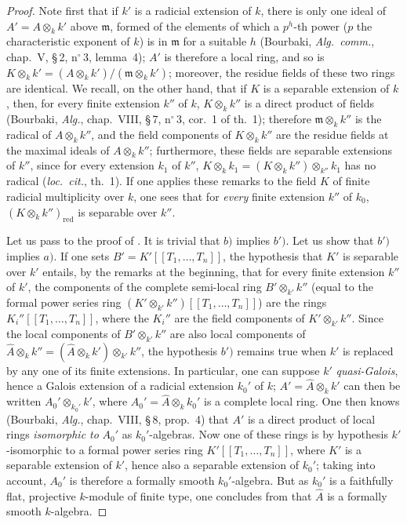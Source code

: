 \begin{proof}
Note first that if $k'$ is a radicial extension of $k$, there is only one ideal of $A'=A\otimes_k k'$ above $\mathfrak{m}$, formed of the elements of which a $p^h$-th power ($p$ the characteristic exponent of $k$) is in $\mathfrak{m}$ for a suitable $h$ (Bourbaki, \emph{Alg.\ comm.}, chap.~V, \S\,2, n$^\circ$\,3, lemma~4);
$A'$ is therefore a local ring, and so is
$K\otimes_k k'=(A\otimes_k k')/(\mathfrak{m}\otimes_k k')$; moreover, the residue fields of these two rings are identical.
We recall, on the other hand, that if $K$ is a separable extension of $k$, then, for every finite extension $k''$ of $k$, $K\otimes_k k''$ is a direct product of fields (Bourbaki, \emph{Alg.}, chap.~VIII, \S\,7, n$^\circ$\,3, cor.~1 of th.~1);
therefore $\mathfrak{m}\otimes_k k''$ is the radical of $A\otimes_k k''$, and the field components of $K\otimes_k k''$ are the residue fields at the maximal ideals of $A\otimes_k k''$;
furthermore, these fields are separable extensions of $k''$, since for every extension $k_1$ of $k''$,
$K\otimes_k k_1=(K\otimes_k k'')\otimes_{k''}k_1$ has no radical (\emph{loc.\ cit.}, th.~1).
If one applies these remarks to the field $K$ of finite radicial multiplicity over $k$, one sees that for \emph{every} finite extension $k''$ of $k_0$, $(K\otimes_k k'')_{\mathrm{red}}$ is separable over $k''$.

Let us pass to the proof of .
It is trivial that $b)$ implies $b')$.
Let us show that $b')$ implies $a)$.
If one sets $B'=K'[[T_1,\ldots,T_n]]$,
the hypothesis that $K'$ is separable over $k'$ entails, by the remarks at the beginning, that for every finite extension $k''$ of $k'$, the components of the complete semi-local ring
$B'\otimes_{k'}k''$ (equal to the formal power series ring
$(K'\otimes_{k'}k'')[[T_1,\ldots,T_n]]$) are the rings
$K_i''[[T_1,\ldots,T_n]]$, where the $K_i''$ are the field components of
$K'\otimes_{k'}k''$.
Since the local components of $B'\otimes_{k'}k''$ are also local components of $\widehat{A}\otimes_k k''
=(\widehat{A}\otimes_k k')\otimes_{k'}k''$,
the hypothesis $b')$ remains true when $k'$ is replaced by any one of its finite extensions.
In particular, one can suppose $k'$ \emph{quasi-Galois}, hence a Galois extension of a radicial extension $k_0'$ of $k$;
$A'=\widehat{A}\otimes_k k'$ can then be written
$A_0'\otimes_{k_0'}k'$, where $A_0'=\widehat{A}\otimes_k k_0'$ is a complete local ring.
One then knows (Bourbaki, \emph{Alg.}, chap.~VIII, \S\,8, prop.~4) that $A'$
is a direct product of local rings \emph{isomorphic to} $A_0'$ as
$k_0'$-algebras. Now one of these rings is by hypothesis $k'$-isomorphic to a
formal power series ring $K'[[T_1,\ldots,T_n]]$, where $K'$ is a separable
extension of $k'$, hence also a separable extension of $k_0'$; taking
 into account, $A_0'$ is therefore a formally smooth
$k_0'$-algebra. But as $k_0'$ is a faithfully flat, projective $k$-module of
finite type, one concludes from  that $\widehat{A}$ is a
formally smooth $k$-algebra.


\end{proof}
